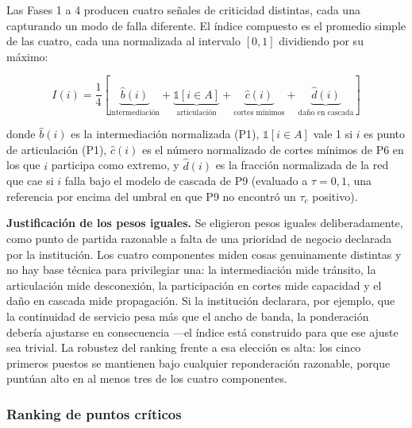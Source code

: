 \documentclass[10pt,a4paper]{extarticle}
\begin{document}
Las Fases 1 a 4 producen cuatro señales de criticidad distintas, cada una capturando un modo
de falla diferente. El índice compuesto es el promedio simple de las cuatro, cada una
normalizada al intervalo $[0,1]$ dividiendo por su máximo:

\[
I(i) = \frac{1}{4}\left[
\underbrace{\widehat{b}(i)}_{\text{intermediación}} +
\underbrace{\mathbb{1}[i \in A]}_{\text{articulación}} +
\underbrace{\widehat{c}(i)}_{\text{cortes mínimos}} +
\underbrace{\widehat{d}(i)}_{\text{daño en cascada}}
\right]
\]

donde $\widehat{b}(i)$ es la intermediación normalizada (P1), $\mathbb{1}[i \in A]$ vale 1 si
$i$ es punto de articulación (P1), $\widehat{c}(i)$ es el número normalizado de cortes
mínimos de P6 en los que $i$ participa como extremo, y $\widehat{d}(i)$ es la fracción
normalizada de la red que cae si $i$ falla bajo el modelo de cascada de P9 (evaluado a
$\tau = 0{,}1$, una referencia por encima del umbral en que P9 no encontró un $\tau_c$
positivo).

\textbf{Justificación de los pesos iguales.} Se eligieron pesos iguales deliberadamente,
como punto de partida razonable a falta de una prioridad de negocio declarada por la
institución. Los cuatro componentes miden cosas genuinamente distintas y no hay base técnica
para privilegiar una: la intermediación mide tránsito, la articulación mide desconexión, la
participación en cortes mide capacidad y el daño en cascada mide propagación. Si la
institución declarara, por ejemplo, que la continuidad de servicio pesa más que el ancho de
banda, la ponderación debería ajustarse en consecuencia ---el índice está construido para que
ese ajuste sea trivial. La robustez del ranking frente a esa elección es alta: los cinco
primeros puestos se mantienen bajo cualquier reponderación razonable, porque puntúan alto en
al menos tres de los cuatro componentes.

\subsubsection{Ranking de puntos críticos}
\end{document}
